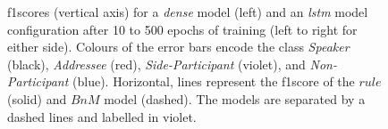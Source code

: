 \begin{figure}[!ht]
    \centering
    \begin{footnotesize}
    
    \end{footnotesize}
    \caption[Role recognition results with longer training.]{\label{app:role-nn-f1-class-long} 
    \Glspl{f1score} (vertical axis) for a \emph{dense} model (left) and an \emph{lstm} model configuration after 10 to 500 epochs of training (left to right for either side).
    Colours of the error bars encode the class \emph{Speaker} (black), \emph{Addressee} (red), \emph{Side-Participant} (violet), and \emph{Non-Participant} (blue).
    Horizontal, lines represent the \gls{f1score} of the \(rule\) (solid) and \(BnM\) model (dashed).
    The models are separated by a dashed lines and labelled in violet.
    }
\end{figure}
